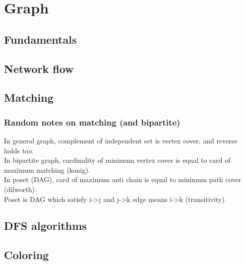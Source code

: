\chapter{Graph}

\section{Fundamentals}

\section{Network flow}

\section{Matching}
\subsection{Random notes on matching (and bipartite)}
In general graph, complement of independent set is vertex cover, and reverse holds too. \\
In bipartite graph, cardinality of minimum vertex cover is equal to card of maximum matching (konig). \\
In poset (DAG), card of maximum anti chain is equal to minimum path cover (dilworth). \\
Poset is DAG which satisfy i->j and j->k edge means i->k (transitivity).


\section{DFS algorithms}

\section{Coloring}

